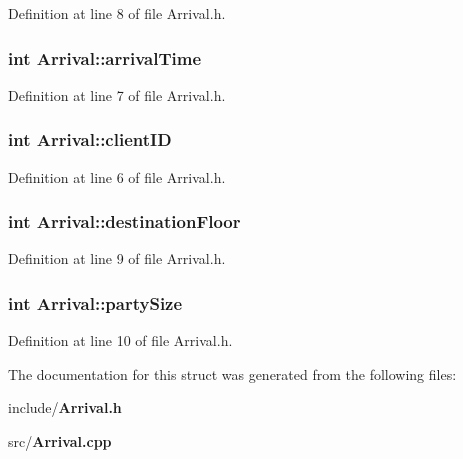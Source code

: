 Definition at line 8 of file Arrival.\+h.

\subsubsection[{arrival\+Time}]{\setlength{\rightskip}{0pt plus 5cm}int Arrival\+::arrival\+Time}\label{struct_arrival_a1604fbb65bfcc4c08cb2a4e31533dd15}


Definition at line 7 of file Arrival.\+h.

\subsubsection[{client\+I\+D}]{\setlength{\rightskip}{0pt plus 5cm}int Arrival\+::client\+I\+D}\label{struct_arrival_ad125f5bf352f24c0f02fbd25833fcbe9}


Definition at line 6 of file Arrival.\+h.

\subsubsection[{destination\+Floor}]{\setlength{\rightskip}{0pt plus 5cm}int Arrival\+::destination\+Floor}\label{struct_arrival_ae3cbceb243227c0e74011dcb04176e2f}


Definition at line 9 of file Arrival.\+h.

\subsubsection[{party\+Size}]{\setlength{\rightskip}{0pt plus 5cm}int Arrival\+::party\+Size}\label{struct_arrival_a13cb78aefa91f18325ff068a2bd4ca93}


Definition at line 10 of file Arrival.\+h.



The documentation for this struct was generated from the following files\+:\begin{DoxyCompactItemize}
\item 
include/{\bf Arrival.\+h}\item 
src/{\bf Arrival.\+cpp}\end{DoxyCompactItemize}
